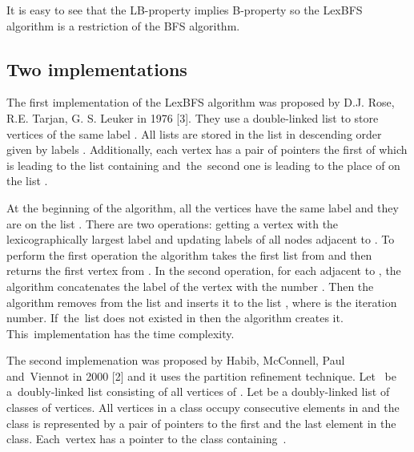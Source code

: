 \documentclass[a4paper, 11pt]{article}
\begin{document}
It is easy to see that the LB-property implies B-property so the LexBFS algorithm is 
a restriction of the BFS algorithm.

\subsection{Two implementations}

The first implementation of the LexBFS algorithm was proposed by D.J. Rose, R.E. Tarjan, G. S. 
Leuker in 1976 [3]. They use a double-linked list  to store vertices of the same label .
All lists  are stored in the list  in descending order given by labels .
Additionally, each vertex  has a pair of pointers the first of which is leading to the 
list  containing  and~the~second one is leading to the place of  on the list . 

At the beginning of the algorithm, all the vertices have the same label  and they are 
on the list . There are two operations: getting a vertex  with the lexicographically
largest label and updating labels of all nodes adjacent to . To perform the first 
operation the algorithm takes the first list  from  and then returns the first vertex from 
. In the second operation, for each  adjacent to , the algorithm concatenates 
the label  of the vertex  with the number . Then the algorithm removes  from 
the list  and inserts it to the list , where  is the iteration number. 
If~the~list  does not existed in  then the algorithm creates it.
This~implementation has the  time complexity. 

The second implemenation was proposed by Habib, McConnell, Paul and~Viennot in 2000 [2] and
it uses the partition refinement technique. Let~ be a~doubly-linked list consisting of all 
vertices of . Let  be a doubly-linked list of classes of vertices. All vertices in a class
occupy consecutive elements in  and the class is represented by a pair of pointers to the first 
and the last element in the class. Each~vertex  has a pointer to the class containing~.\\ 
\end{document}
